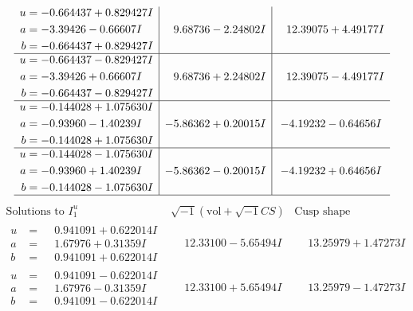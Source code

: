 \documentclass[1p]{elsarticle_modified}
\theoremstyle{definition}
\newcommand{\I}{\sqrt{-1}}
\begin{document}
$$\begin{array}{c|c|c}
\begin{aligned}
u &= -0.664437 + 0.829427 I \\
a &= -3.39426 - 0.66607 I \\
b &= -0.664437 + 0.829427 I\end{aligned}
 & \phantom{-}9.68736 - 2.24802 I & \phantom{-}12.39075 + 4.49177 I \\ \hline\begin{aligned}
u &= -0.664437 - 0.829427 I \\
a &= -3.39426 + 0.66607 I \\
b &= -0.664437 - 0.829427 I\end{aligned}
 & \phantom{-}9.68736 + 2.24802 I & \phantom{-}12.39075 - 4.49177 I \\ \hline\begin{aligned}
u &= -0.144028 + 1.075630 I \\
a &= -0.93960 - 1.40239 I \\
b &= -0.144028 + 1.075630 I\end{aligned}
 & -5.86362 + 0.20015 I & -4.19232 - 0.64656 I \\ \hline\begin{aligned}
u &= -0.144028 - 1.075630 I \\
a &= -0.93960 + 1.40239 I \\
b &= -0.144028 - 1.075630 I\end{aligned}
 & -5.86362 - 0.20015 I & -4.19232 + 0.64656 I\\
 \hline 
 \end{array}$$\newpage$$\begin{array}{c|c|c}  
\text{Solutions to }I^u_{1}& \I (\text{vol} + \sqrt{-1}CS) & \text{Cusp shape}\\
 \hline 
\begin{aligned}
u &= \phantom{-}0.941091 + 0.622014 I \\
a &= \phantom{-}1.67976 + 0.31359 I \\
b &= \phantom{-}0.941091 + 0.622014 I\end{aligned}
 & \phantom{-}12.33100 - 5.65494 I & \phantom{-}13.25979 + 1.47273 I \\ \hline\begin{aligned}
u &= \phantom{-}0.941091 - 0.622014 I \\
a &= \phantom{-}1.67976 - 0.31359 I \\
b &= \phantom{-}0.941091 - 0.622014 I\end{aligned}
 & \phantom{-}12.33100 + 5.65494 I & \phantom{-}13.25979 - 1.47273 I \\ \hline\begin{aligned}

\end{aligned}
\end{array}$$
\end{document}
